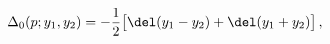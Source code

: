 \begin{equation}
[\d_{y_1}^2 + p^2] \Delta_0(p;y_1,y_2) = -\frac{1}{2}
\big[\del(y_1-y_2)+\del(y_1+y_2) \big] \, ,
\label{prop0}  
\end{equation}


